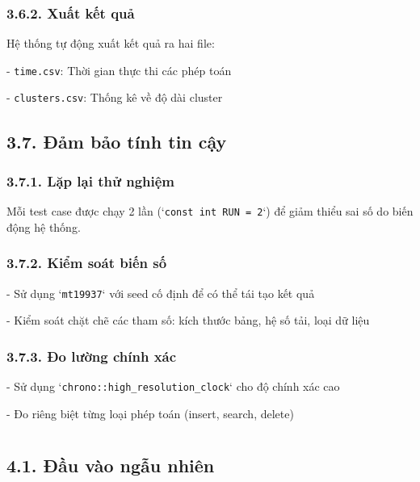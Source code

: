 \documentclass[12pt,a4paper]{report}
\begin{document}
\subsection*{3.6.2. Xuất kết quả}
\noindent \indent Hệ thống tự động xuất kết quả ra hai file:

- \texttt{time.csv}: Thời gian thực thi các phép toán

- \texttt{clusters.csv}: Thống kê về độ dài cluster

\section*{3.7. Đảm bảo tính tin cậy}

\subsection*{3.7.1. Lặp lại thử nghiệm}
\noindent \indent Mỗi test case được chạy 2 lần (`\texttt{const int RUN = 2}`) để giảm thiểu sai số do biến động hệ thống.

\subsection*{3.7.2. Kiểm soát biến số}

\noindent \indent - Sử dụng `\texttt{mt19937}` với seed cố định để có thể tái tạo kết quả

- Kiểm soát chặt chẽ các tham số: kích thước bảng, hệ số tải, loại dữ liệu

\subsection*{3.7.3. Đo lường chính xác}

\noindent \indent - Sử dụng `\texttt{chrono::high\_resolution\_clock}` cho độ chính xác cao

- Đo riêng biệt từng loại phép toán (insert, search, delete)







\newpage
\chapter*{}
\section*{4.1. Đầu vào ngẫu nhiên}
\end{document}
